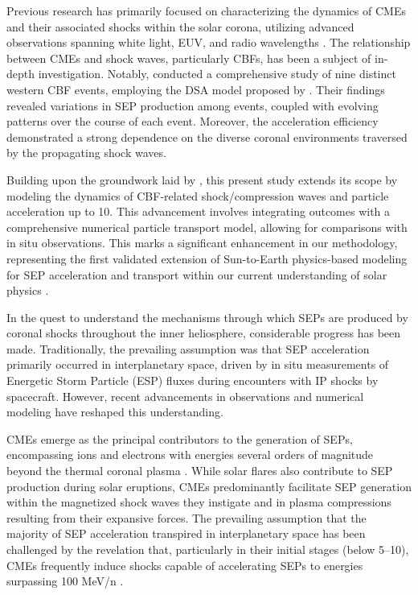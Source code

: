 Previous research has primarily focused on characterizing the dynamics of CMEs and their associated shocks within the solar corona, utilizing advanced observations spanning white light, EUV, and radio wavelengths \citep{vourlidas_2003, zhang_2006, bein_2011}. The relationship between CMEs and shock waves, particularly CBFs, has been a subject of in-depth investigation. Notably, \citet{kozarev_2019} conducted a comprehensive study of nine distinct western CBF events, employing the DSA model proposed by \citet{kozarev_2016}. Their findings revealed variations in SEP production among events, coupled with evolving patterns over the course of each event. Moreover, the acceleration efficiency demonstrated a strong dependence on the diverse coronal environments traversed by the propagating shock waves.

Building upon the groundwork laid by \citet{kozarev_2019}, this present study extends its scope by modeling the dynamics of CBF-related shock/compression waves and particle acceleration up to 10\rsun. This advancement involves integrating outcomes with a comprehensive numerical particle transport model, allowing for comparisons with in situ observations. This marks a significant enhancement in our methodology, representing the first validated extension of Sun-to-Earth physics-based modeling for SEP acceleration and transport within our current understanding of solar physics \citep{kozarev_2022}.

In the quest to understand the mechanisms through which SEPs are produced by coronal shocks throughout the inner heliosphere, considerable progress has been made. Traditionally, the prevailing assumption was that SEP acceleration primarily occurred in interplanetary space, driven by in situ measurements of Energetic Storm Particle (ESP) fluxes during encounters with IP shocks by spacecraft. However, recent advancements in observations and numerical modeling have reshaped this understanding.

CMEs emerge as the principal contributors to the generation of SEPs, encompassing ions and electrons with energies several orders of magnitude beyond the thermal coronal plasma \citep{reames_1999}. While solar flares also contribute to SEP production during solar eruptions, CMEs predominantly facilitate SEP generation within the magnetized shock waves they instigate and in plasma compressions resulting from their expansive forces. The prevailing assumption that the majority of SEP acceleration transpired in interplanetary space has been challenged by the revelation that, particularly in their initial stages (below 5–10\rsun), CMEs frequently induce shocks capable of accelerating SEPs to energies surpassing 100 MeV/n \citep{ontiveross_2009, gopalswamy_2011, battarbee_2013, kozarev_2013, schwadron_2014, kong_2017}.

